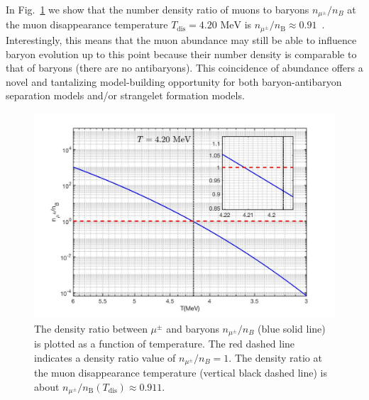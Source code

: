 \documentclass[universe,article,submit,moreauthors,pdftex,a4paper]{Definitions/mdpi}
\newcommand{\MeV}{\text{ MeV}}
\newcommand*{\rf}[1]{Fig.~{\ref{#1}}}
\newcommand*{\xblue}{\color{black}}
\begin{document}
In \rf{muonRatio_fig} we show that the number density ratio of muons to baryons $n_{\mu^{\pm}}/n_{B}$ at the muon disappearance temperature $T_\mathrm{dis} = 4.20\MeV$ is $n_{\mu^\pm}/n_\mathrm{B}\approx0.91$~\cite{Yang:2021bko}. {\xblue  Interestingly, this means that the muon abundance may still be able to influence baryon evolution up to this point because their number density is comparable to that of baryons (there are no antibaryons). This coincidence of abundance offers a novel and tantalizing model-building opportunity for  both baryon-antibaryon separation models and/or strangelet formation models.}

\begin{figure}[ht]
\centering
\includegraphics[width=0.9\columnwidth]{./plots/DensityRatio_new2.jpg}
\caption{The density ratio between $\mu^\pm$ and baryons $n_{\mu^{\pm}}/n_{B}$ (blue solid line) is plotted as a function of temperature. The red dashed line indicates a density ratio value of $n_{\mu^{\pm}}/n_{B}=1$. The density ratio at the muon disappearance temperature (vertical black dashed line) is about $n_{\mu^\pm}/n_\mathrm{B}(T_\mathrm{dis})\approx0.911$.}
\label{muonRatio_fig} 
\end{figure}

\end{document}
